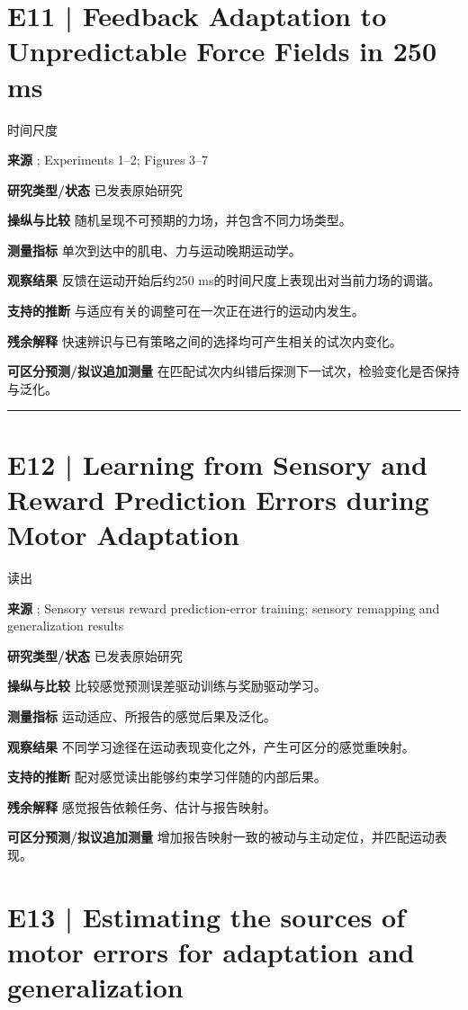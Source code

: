 \documentclass[11pt,a4paper]{article}
\begin{document}
\clearpage\section{E11 | Feedback Adaptation to Unpredictable Force Fields in 250 ms}
{\small\sffamily\color{navy} 时间尺度}\par
\textbf{来源} \cite{crevecoeur2020}; Experiments 1--2; Figures 3--7\par
\textbf{研究类型/状态} 已发表原始研究\par
\textbf{操纵与比较} 随机呈现不可预期的力场，并包含不同力场类型。\par
\textbf{测量指标} 单次到达中的肌电、力与运动晚期运动学。\par
\textbf{观察结果} 反馈在运动开始后约250 ms的时间尺度上表现出对当前力场的调谐。\par
\textbf{支持的推断} 与适应有关的调整可在一次正在进行的运动内发生。\par
\textbf{残余解释} 快速辨识与已有策略之间的选择均可产生相关的试次内变化。\par
\textbf{可区分预测/拟议追加测量} 在匹配试次内纠错后探测下一试次，检验变化是否保持与泛化。\par
\bigskip\hrule\medskip\section{E12 | Learning from Sensory and Reward Prediction Errors during Motor Adaptation}
{\small\sffamily\color{navy} 读出}\par
\textbf{来源} \cite{izawa2011}; Sensory versus reward prediction-error training; sensory remapping and generalization results\par
\textbf{研究类型/状态} 已发表原始研究\par
\textbf{操纵与比较} 比较感觉预测误差驱动训练与奖励驱动学习。\par
\textbf{测量指标} 运动适应、所报告的感觉后果及泛化。\par
\textbf{观察结果} 不同学习途径在运动表现变化之外，产生可区分的感觉重映射。\par
\textbf{支持的推断} 配对感觉读出能够约束学习伴随的内部后果。\par
\textbf{残余解释} 感觉报告依赖任务、估计与报告映射。\par
\textbf{可区分预测/拟议追加测量} 增加报告映射一致的被动与主动定位，并匹配运动表现。\par
\clearpage\section{E13 | Estimating the sources of motor errors for adaptation and generalization}
\end{document}
